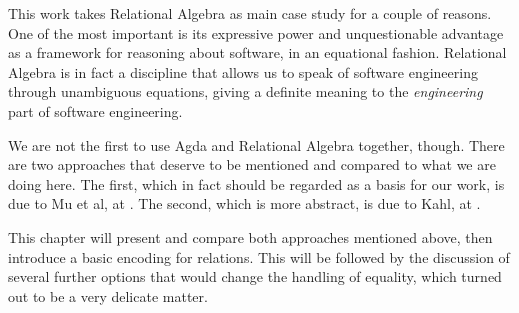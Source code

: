 This work takes Relational Algebra\cite{Bird97} as main case study for a couple of reasons. One of the most
important is its expressive power and unquestionable advantage as a framework for
reasoning about software, in an equational fashion. Relational Algebra is in fact a discipline that
allows us to speak of software engineering through unambiguous equations, giving a definite meaning
to the \emph{engineering} part of software engineering.

We are not the first to use Agda and Relational Algebra together, though. There are two approaches
that deserve to be mentioned and compared to what we are doing here. The first, which in fact
should be regarded as a basis for our work, is due to Mu et al, at \cite{Jansson09}. 
The second, which is more abstract, is due to Kahl, at \cite{RATHAgda}.

This chapter will present and compare both approaches mentioned above, 
then introduce a basic encoding for relations. This will be followed by the discussion of several 
further options that would change the handling of equality, which turned out to be a very
delicate matter. 
